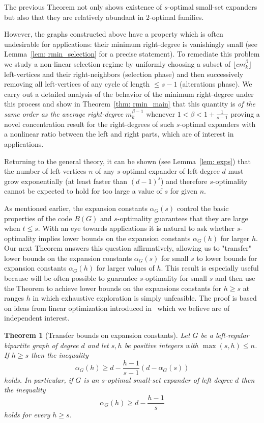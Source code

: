 \documentclass[12pt]{amsart}
\newtheorem{theorem}[lemma]{Theorem}
\theoremstyle{definition}
\renewcommand{\geq}{\geqslant}
\renewcommand{\leq}{\leqslant}
\newcommand{\1}{\ensuremath{\mathbb{1}}}
\begin{document}
The previous Theorem not only shows existence of $s$-optimal small-set expanders but also that they are relatively abundant in $2$-optimal families.

\medskip


However, the graphs constructed above have a property which is often undesirable for applications: their minimum right-degree is vanishingly small (see Lemma~\ref{lem: rmin_selection} for a precise statement). To remediate this problem we study a non-linear selection regime by uniformly choosing a subset of $\lfloor cm_k^\beta \rfloor$ left-vertices and their right-neighbors (selection phase) and then successively removing all left-vertices of any cycle of length $\leq s-1$ (alterations phase). We carry out a detailed analysis of the behavior of the minimum right-degree under this process and show in Theorem~\ref{thm: rmin_main} that this quantity is \emph{of the same order as the average right-degree} $m_k^{\beta-1}$ whenever $1<\beta<1+\frac{1}{s-1}$ proving a novel concentration result for the right-degrees of such $s$-optimal expanders with a nonlinear ratio between the left and right parts, which are of interest in applications.

Returning to the general theory, it can be shown (see Lemma~\ref{lem: exps}) that the number of left vertices $n$ of any $s$-optimal expander of left-degree $d$ must grow exponentially (at least faster than $(d-1)^s$) and therefore $s$-optimality cannot be expected to hold for too large a value of $s$ for given $n$. 

As mentioned earlier, the expansion constants $\alpha_G(s)$ control the basic properties of the code $B(G)$ and $s$-optimality guarantees that they are large when $t\leq s$. With an eye towards applications it is natural to ask whether $s$-optimality implies lower bounds on the expansion constants $\alpha_G(h)$ for larger $h$. Our next Theorem answers this question affirmatively, allowing us to "transfer" lower bounds on the expansion constants $\alpha_G(s)$ for small $s$ to lower bounds for expansion constants $\alpha_G(h)$ for larger values of $h$. This result is especially useful because will be often possible to guarantee $s$-optimality for small $s$ and then use the Theorem to achieve lower bounds on the expansions constants for $h\geq s$ at ranges $h$ in which exhaustive exploration is simply unfeasible. The proof is based on ideas from linear optimization introduced in~\cite{CCLO} which we believe are of independent interest.

\begin{theorem}[Transfer bounds on expansion constants] \label{Thm: transfer} Let $G$ be a left-regular bipartite graph of degree $d$ and let $s,h$ be positive integers with $\max(s,h)\leq n$. If $h\geq s$ then the inequality
\[\alpha_G(h)\geq d-\frac{h-1}{s-1}\left(d-\alpha_G(s)\right)\]
holds. In particular, if $G$ is an $s$-optimal small-set expander of left degree $d$ then the inequality 
\[\alpha_G(h)\geq d-\frac{h-1}{s}\] holds for every $h\geq s$.
\end{theorem}
\end{document}
